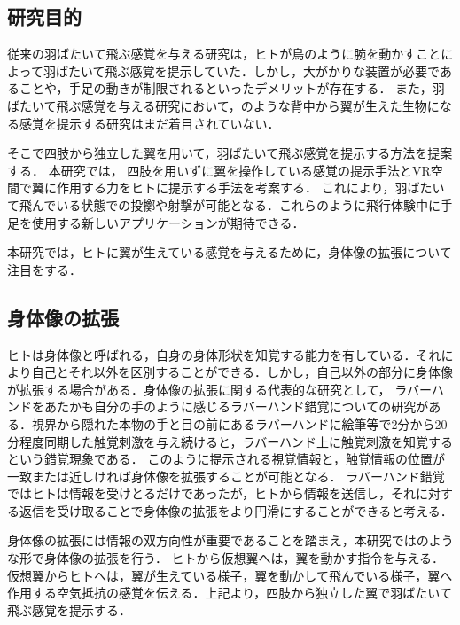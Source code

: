     \subsection{研究目的}
    従来の羽ばたいて飛ぶ感覚を与える研究は，ヒトが鳥のように腕を動かすことによって羽ばたいて飛ぶ感覚を提示していた．しかし，大がかりな装置が必要であることや，手足の動きが制限されるといったデメリットが存在する．
    また，羽ばたいて飛ぶ感覚を与える研究において，のような背中から翼が生えた生物になる感覚を提示する研究はまだ着目されていない．

    そこで四肢から独立した翼を用いて，羽ばたいて飛ぶ感覚を提示する方法を提案する．
    本研究では，
    四肢を用いずに翼を操作している感覚の提示手法とVR空間で翼に作用する力をヒトに提示する手法を考案する．
    これにより，羽ばたいて飛んでいる状態での投擲や射撃が可能となる．これらのように飛行体験中に手足を使用する新しいアプリケーションが期待できる．

    本研究では，ヒトに翼が生えている感覚を与えるために，身体像の拡張について注目をする．

    
    \subsection{身体像の拡張}
    ヒトは身体像と呼ばれる，自身の身体形状を知覚する能力を有している．それにより自己とそれ以外を区別することができる．しかし，自己以外の部分に身体像が拡張する場合がある．身体像の拡張に関する代表的な研究として，
    ラバーハンドをあたかも自分の手のように感じるラバーハンド錯覚についての研究がある\cite{botvinick1998rubber}．視界から隠れた本物の手と目の前にあるラバーハンドに絵筆等で2分から20分程度同期した触覚刺激を与え続けると，ラバーハンド上に触覚刺激を知覚するという錯覚現象である．
    このように提示される視覚情報と，触覚情報の位置が一致または近しければ身体像を拡張することが可能となる．
    ラバーハンド錯覚ではヒトは情報を受けとるだけであったが，ヒトから情報を送信し，それに対する返信を受け取ることで身体像の拡張をより円滑にすることができると考える．
    
    身体像の拡張には情報の双方向性が重要であることを踏まえ，本研究ではのような形で身体像の拡張を行う．
    ヒトから仮想翼へは，翼を動かす指令を与える．仮想翼からヒトへは，翼が生えている様子，翼を動かして飛んでいる様子，翼へ作用する空気抵抗の感覚を伝える．上記より，四肢から独立した翼で羽ばたいて飛ぶ感覚を提示する．
    
